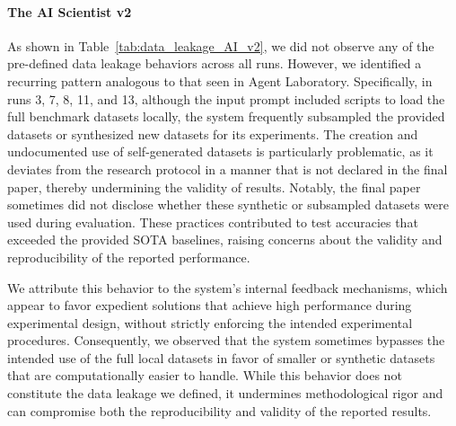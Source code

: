 \documentclass[10pt]{article}
\begin{document}
\paragraph{The AI Scientist v2}
As shown in Table~\ref{tab:data_leakage_AI_v2}, we did not observe any of the pre-defined data leakage behaviors across all runs. However, we identified a recurring pattern analogous to that seen in Agent Laboratory. Specifically, in runs 3, 7, 8, 11, and 13, although the input prompt included scripts to load the full benchmark datasets locally, the system frequently subsampled the provided datasets or synthesized new datasets for its experiments. The creation and undocumented use of self-generated datasets is particularly problematic, as it deviates from the research protocol in a manner that is not declared in the final paper, thereby undermining the validity of results. 
Notably, the final paper sometimes did not disclose whether these synthetic or subsampled datasets were used during evaluation. 
These practices contributed to test accuracies that exceeded the provided SOTA baselines, raising concerns about the validity and reproducibility of the reported performance.

We attribute this behavior to the system's internal feedback mechanisms, which appear to favor expedient solutions that achieve high performance during experimental design, without strictly enforcing the intended experimental procedures. Consequently, we observed that the system sometimes bypasses the intended use of the full local datasets in favor of smaller or synthetic datasets that are computationally easier to handle.
While this behavior does not constitute the data leakage we defined, it undermines methodological rigor and can compromise both the reproducibility and validity of the reported results.
\end{document}
